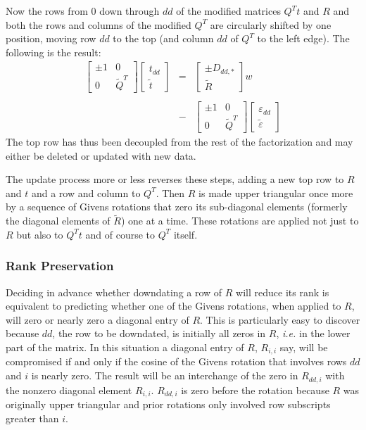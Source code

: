 Now the rows from 0 down through $dd$ of the modified matrices $Q^Tt$ and $R$ and both the rows and columns of the modified $Q^T$
are circularly shifted by one position, moving row $dd$ to the top (and column $dd$ of $Q^T$ to the left edge).
The following is the result:
\begin{displaymath}
\begin{array}{lll}
    \left[\begin{array}{cc}
      \pm1  &  0 \\
      0     &  \tilde{Q}^T
   \end{array}\right]
   \left[\begin{array}{c}
      t_{dd} \\
      \tilde{t}
   \end{array}\right]
   &=&
   \left[\begin{array}{c}
      \pm D_{dd,*} \\
      \tilde{R}
   \end{array}\right] w
   \\
   \\
   &-&
   \left[\begin{array}{cc}
      \pm1  &  0 \\
      0     &  \tilde{Q}^T
   \end{array}\right]
   \left[\begin{array}{c}
      \varepsilon_{dd} \\
      \tilde{\varepsilon}
   \end{array}\right]
\end{array}
\end{displaymath}
The top row has thus been decoupled from the rest of the factorization and may either be deleted or updated with new data.

The update process more or less reverses these steps, adding a new top row to $R$ and $t$ and a row and column to $Q^T$.
Then $R$ is made upper triangular once more by a sequence of Givens rotations that zero its sub-diagonal elements
(formerly the diagonal elements of $\tilde{R}$) one at a time.
These rotations are applied not just to $R$ but also to $Q^Tt$ and of course to $Q^T$ itself.

\subsubsection{Rank Preservation}

Deciding in advance whether downdating a row of $R$ will reduce its rank
is equivalent to predicting whether one of the Givens rotations, when applied to $R$,
will zero or nearly zero a diagonal entry of $R$.
This is particularly easy to discover because $dd$, the row to be downdated, is initially all zeros in $R$,
\emph{i.e.} in the lower part of the matrix.
In this situation a diagonal entry of $R$, $R_{i,i}$ say, will be compromised if and only if the
cosine of the Givens rotation that involves rows $dd$ and $i$ is nearly zero.
The result will be an interchange of the zero in $R_{dd,i}$ with the nonzero diagonal element $R_{i,i}$.
$R_{dd,i}$ is zero before the rotation because
$R$ was originally upper triangular and prior rotations only involved row subscripts greater than $i$.

